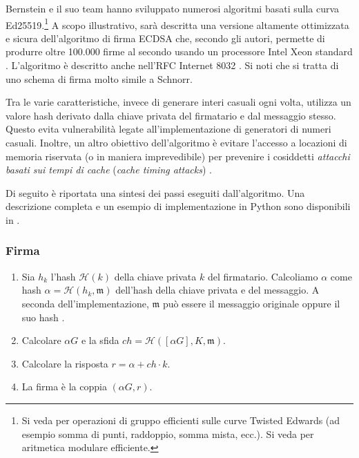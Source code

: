 Bernstein e il suo team hanno sviluppato numerosi algoritmi basati sulla curva Ed25519.\footnote{\label{group_ops_twisted_edwards_note}Si veda \cite{Bernstein2007} per operazioni di gruppo efficienti sulle curve Twisted Edwards (ad esempio somma di punti, raddoppio, somma mista, ecc.). Si veda \cite{curve25519} per aritmetica modulare efficiente.} 
A scopo illustrativo, sarà descritta una versione altamente ottimizzata e sicura dell’algoritmo di firma ECDSA che, secondo gli autori, permette di produrre oltre 100.000 firme al secondo usando un processore Intel Xeon standard \cite{Bernstein2012}. L’algoritmo è descritto anche nell’RFC Internet 8032 \cite{rfc8032}. Si noti che si tratta di uno schema di firma molto simile a Schnorr.

Tra le varie caratteristiche, invece di generare interi casuali ogni volta, utilizza un valore hash derivato dalla chiave privata del firmatario e dal messaggio stesso. Questo evita vulnerabilità legate all’implementazione di generatori di numeri casuali. Inoltre, un altro obiettivo dell’algoritmo è evitare l’accesso a locazioni di memoria riservata (o in maniera imprevedibile) per prevenire i cosiddetti {\em attacchi basati sui tempi di cache} (\emph{cache timing attacks}) \cite{Bernstein2012}.

Di seguito è riportata una sintesi dei passi eseguiti dall’algoritmo. Una descrizione completa e un esempio di implementazione in Python sono disponibili in \cite{rfc8032}. 

\subsubsection*{Firma}

\begin{enumerate}
	\item Sia \(h_k\) l’hash \(\mathcal{H}(k)\) della chiave privata \(k\) del firmatario. 
	Calcoliamo \(\alpha\) come hash \(\alpha = \mathcal{H}(h_k, \mathfrak{m})\) dell’hash della chiave privata e del messaggio. A seconda dell’implementazione, \(\mathfrak{m}\) può essere il messaggio originale oppure il suo hash \cite{rfc8032}.
	
	\item Calcolare \(\alpha G\) e la sfida \(ch = \mathcal{H}([\alpha G], K, \mathfrak{m})\).

	\item Calcolare la risposta \(r = \alpha + ch \cdot k \).
	
	\item La firma è la coppia \((\alpha G, r)\).
\end{enumerate}

